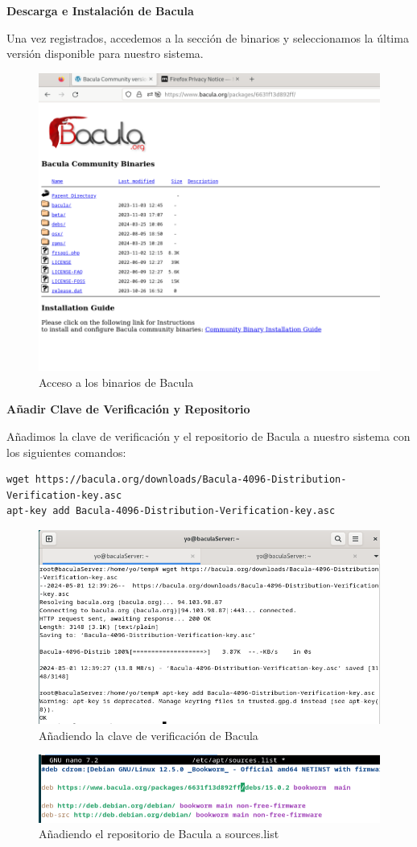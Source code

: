 \textbf{Descarga e Instalación de Bacula}\medskip

Una vez registrados, accedemos a la sección de binarios y seleccionamos la última versión disponible para nuestro sistema.

\begin{figure}[H]
    \centering
    \includegraphics[width=0.5\linewidth]{instalacionBacula/baculapackages.png}
    \caption{Acceso a los binarios de Bacula}
\end{figure}

\textbf{Añadir Clave de Verificación y Repositorio}\medskip

Añadimos la clave de verificación y el repositorio de Bacula a nuestro sistema con los siguientes comandos:
\begin{verbatim}
wget https://bacula.org/downloads/Bacula-4096-Distribution-Verification-key.asc
apt-key add Bacula-4096-Distribution-Verification-key.asc
\end{verbatim}

\begin{figure}[H]
    \centering
    \includegraphics[width=0.5\linewidth]{instalacionBacula/baculaSignature.png}
    \caption{Añadiendo la clave de verificación de Bacula}
\end{figure}

\begin{figure}[H]
    \centering
    \includegraphics[width=0.5\linewidth]{instalacionBacula/baculaRepositorio.png}
    \caption{Añadiendo el repositorio de Bacula a sources.list}
\end{figure}


